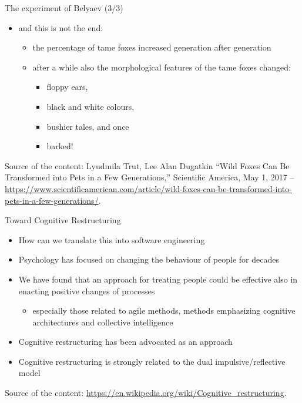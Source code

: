 \documentclass{beamer}
\begin{document}
\begin{frame}
{\centerline{The experiment of Belyaev (3/3)}}


\begin{itemize}
\item and this is not the end:
\begin{itemize}
\item  the percentage of tame foxes increased generation after generation
\item after a while also the morphological features of the tame foxes changed:
\begin{itemize}
\item floppy ears,
\item black and white colours,
\item bushier tales, and once
\item barked!
\end{itemize}
\end{itemize} 
 


\end{itemize} 

\begin{center}
\tiny
Source of the content: Lyudmila Trut, Lee Alan Dugatkin ``Wild Foxes Can Be Transformed into Pets in a Few Generations,'' Scientific America, May 1, 2017 -- \url{https://www.scientificamerican.com/article/wild-foxes-can-be-transformed-into-pets-in-a-few-generations/}.
\end{center}

\end{frame}




\begin{frame}
{\centerline{Toward Cognitive Restructuring}}


\begin{itemize}
\item How can we translate this into software engineering
\item Psychology has focused on changing the behaviour of people for decades
\item We have found that an approach for treating people could be effective also in enacting positive changes of processes
\begin{itemize}
\item especially those related to agile methods, methods emphasizing cognitive architectures and collective intelligence
\end{itemize} 
\item Cognitive restructuring has been advocated as an approach
\item Cognitive restructuring is strongly related to the dual impulsive/reflective model
\end{itemize} 

\begin{center}
\tiny
Source of the content: \url{https://en.wikipedia.org/wiki/Cognitive_restructuring}.
\end{center}

\end{frame}
\end{document}
